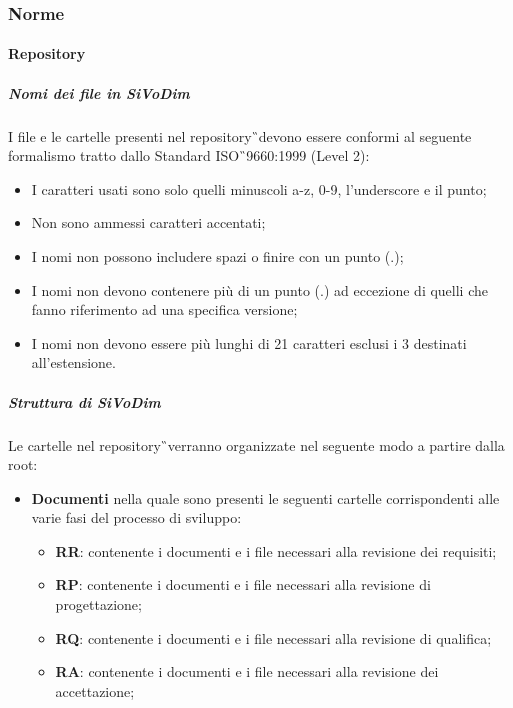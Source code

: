 \subsubsection{Norme}
\paragraph{Repository}
\subparagraph{Nomi dei file in SiVoDim} I file e le cartelle presenti
nel repository\G\ devono essere conformi al seguente formalismo tratto dallo Standard
ISO\G\ 9660:1999 (Level 2):
\begin{itemize}
\item I caratteri usati sono solo quelli minuscoli a-z, 0-9, l’underscore  e il punto;
\item Non sono ammessi caratteri accentati;
\item I nomi non possono includere spazi o finire con un punto (.);
\item I nomi non devono contenere più di un punto (.) ad eccezione di quelli che fanno
riferimento ad una specifica versione;
\item I nomi non devono essere più lunghi di 21 caratteri esclusi i 3 destinati all’estensione.
\end{itemize}

\subparagraph{Struttura di SiVoDim}  Le cartelle nel repository\G\ verranno organizzate nel seguente modo a partire dalla root:
\begin{itemize}
\item \textbf{Documenti} nella quale sono presenti le seguenti cartelle corrispondenti alle varie fasi del processo di sviluppo:
\begin{itemize}
\item \textbf{RR}: contenente i documenti e i file necessari alla revisione dei requisiti;
\item \textbf{RP}: contenente i documenti e i file necessari alla revisione di progettazione;
\item \textbf{RQ}: contenente i documenti e i file necessari alla revisione di qualifica;
\item \textbf{RA}: contenente i documenti e i file necessari alla revisione dei accettazione;
\end{itemize}
\end{itemize}


